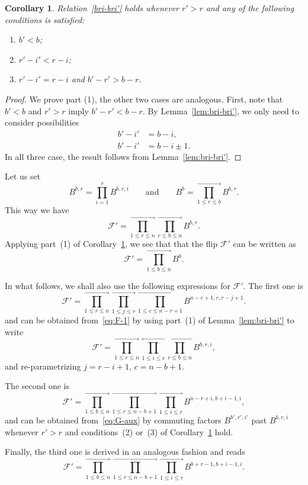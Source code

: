 \documentclass[11pt, reqno]{amsart}
\newtheorem{cor}[theorem]{Corollary}
\theoremstyle{definition}
\numberwithin{equation}{section}
\def\beq{\begin{equation}}
\def\eeq{\end{equation}}
\def\longra{\longrightarrow}
\def\le{\leqslant}
\def\Fc{\mathcal F'}
\begin{document}
\begin{cor}
\label{cor:bri-bri'}
Relation~\eqref{bri-bri'} holds whenever $r'>r$ and any of the following conditions is satisfied:
\begin{enumerate}
\item $b'<b$;
\item $r'-i'<r-i$;
\item $r'-i'=r-i$ and $b'-r'>b-r$.
\end{enumerate}
\end{cor}

\begin{proof}
We prove part (1), the other two cases are analogous. First, note that $b'<b$ and $r'>r$ imply $b'-r'<b-r$. By Lemma~\ref{lem:bri-bri'}, we only need to consider possibilities
\begin{align*}
    b'-i'&=b-i, \\
    b'-i'&=b-i\pm1.
\end{align*}
In all three case, the result follows from Lemma~\ref{lem:bri-bri'}.
\end{proof}

Let us set 
$$
B^{b,r} = \prod_{i=1}^r B^{b,r,i}
\qquad\text{and}\qquad
B^b = \prod_{1 \le r \le b}^{\longra} B^{b,r}.
$$
This way we have
$$
\Fc = \prod_{1 \le r \le n}^{\longra} \prod_{r \le b \le n}^{\longra} B^{b,r}.
$$
Applying part~(1) of Corollary~\ref{cor:bri-bri'}, we see that that the flip $\Fc$ can be written as
\beq
\label{eq:F-2}
\Fc = \prod_{1 \le b \le n}^{\longra} B^b.
\eeq

In what follows, we shall also use the following expressions for $\Fc$. The first one is
\beq
\label{eq:F-4}
\Fc = \prod_{1 \le r \le n}^{\longra} \prod_{1 \le j \le r}^{\longra} \prod_{1 \le c \le n-r+1}^{\longra} B^{n-c+1,r,r-j+1}.
\eeq
and can be obtained from~\eqref{eq:F-1} by using part~(1) of Lemma~\ref{lem:bri-bri'} to write
\beq
\label{eq:G-aux}
\Fc = \prod_{1 \le r \le n}^{\longra} \prod_{1 \le i \le r}^{\longleftarrow} \prod_{r \le b \le n}^{\longleftarrow} B^{b,r,i},
\eeq
and re-parametrizing $j=r-i+1$, $c=n-b+1$.

The second one is
\beq
\label{eq:F-3}
\Fc = \prod_{1 \le b \le n}^{\longra} \prod_{1 \le r \le n-b+1}^{\longra} \prod_{1 \le i \le r}^{\longra} B^{n-r+i,b+i-1,i},
\eeq
and can be obtained from~\eqref{eq:G-aux} by commuting factors $B^{b',r',i'}$ past $B^{b,r,i}$ whenever $r'>r$ and conditions~(2) or~(3) of Corollary~\ref{cor:bri-bri'} hold.

Finally, the third one is derived in an analogous fashion and reads
\beq
\label{eq:F-5}
\Fc = \prod_{1 \le b \le n}^{\longra} \prod_{1 \le r \le n-b+1}^{\longra} \prod_{1 \le i \le r}^{\longra} B^{b+r-1,b+i-1,i}.
\eeq
\end{document}
